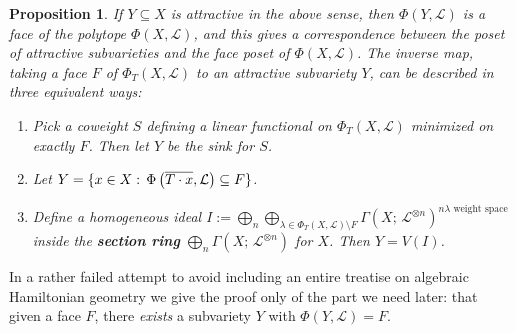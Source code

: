 \documentclass[10pt,a4paper]{amsart}
\newtheorem{proposition}[Thm]{Proposition}
\newcommand{\RR}{\mathbb{R}}
\newcommand\defn[1]{{\bf #1}}
\newcommand\Oplus\bigoplus
\newcommand\tensor\otimes
\newcommand\calL{{\mathcal L}}
\newcommand\junk[1]{}
\renewcommand{\colon}{\mathrel{:}}
\renewcommand{\colon}{:\mkern\thinmuskip}
\begin{document}
\begin{proposition}\label{prop:faceCorrespondence}
  If $Y \subseteq X$ is attractive in the above sense, then $\Phi(Y,\calL)$
  is a face of the polytope $\Phi(X,\calL)$, and this gives a
  correspondence between the poset of attractive subvarieties
  and the face poset of $\Phi(X,\calL)$.
  The inverse map, taking a face $F$ of $\Phi_T(X,\calL)$ to an attractive
  subvariety $Y$, can be described in three equivalent ways:
  \begin{enumerate}
  \item Pick a coweight $S$ defining a linear functional on $\Phi_T(X,\calL)$
    minimized on exactly $F$. Then let $Y$ be the sink for $S$.
  \item Let $Y = \{x\in X\colon \Phi \left(\overline{T\cdot x},\calL \right)
    \subseteq F\}$.
  \item Define a homogeneous ideal
    $I := \Oplus_n \Oplus_{\lambda \in \Phi_T(X,\calL)\setminus F}
    \Gamma(X;\, \calL^{\tensor n})^{n\lambda\text{ weight space}}$
    inside the \defn{section ring} $\Oplus_n \Gamma(X;\, \calL^{\tensor n})$
    for $X$. Then $Y = V(I)$. 
  \end{enumerate}
  \junk{In the toric case $\dim Y = \dim_\RR \Phi(Y,\calL)$, but in general
    we only have $\geq$.}
\end{proposition}

In a rather failed attempt to avoid including an entire treatise on algebraic
Hamiltonian geometry we give the proof only of the part we need later:
that given a face $F$, there {\em exists} a subvariety $Y$ with
$\Phi(Y,\calL) = F$.
\end{document}
